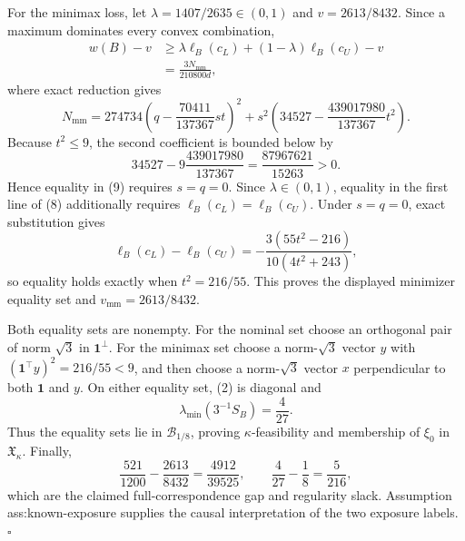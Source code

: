 For the minimax loss, let \(\lambda=1407/2635\in(0,1)\) and \(v=2613/8432\).  Since a maximum dominates every convex combination,
\[
\begin{aligned}
w(B)-v
&\ge \lambda\ell_B(c_L)+(1-\lambda)\ell_B(c_U)-v\\
&=\frac{3N_{\mathrm{mm}}}{210800d},
\end{aligned}
\tag{8}
\]
where exact reduction gives
\[
N_{\mathrm{mm}}
=274734\left(q-\frac{70411}{137367}st\right)^2
+s^2\left(34527-\frac{439017980}{137367}t^2\right).
\tag{9}
\]
Because \(t^2\le9\), the second coefficient is bounded below by
\[
34527-9\frac{439017980}{137367}
=\frac{87967621}{15263}>0.
\tag{10}
\]
Hence equality in (9) requires \(s=q=0\).  Since \(\lambda\in(0,1)\), equality in the first line of (8) additionally requires \(\ell_B(c_L)=\ell_B(c_U)\).  Under \(s=q=0\), exact substitution gives
\[
\ell_B(c_L)-\ell_B(c_U)
=-\frac{3(55t^2-216)}{10(4t^2+243)},
\tag{11}
\]
so equality holds exactly when \(t^2=216/55\).  This proves the displayed minimizer equality set and \(v_{\mathrm{mm}}=2613/8432\).

Both equality sets are nonempty.  For the nominal set choose an orthogonal pair of norm \(\sqrt3\) in \(\mathbf1^\perp\).  For the minimax set choose a norm-\(\sqrt3\) vector \(y\) with \((\mathbf1^{\top}y)^2=216/55<9\), and then choose a norm-\(\sqrt3\) vector \(x\) perpendicular to both \(\mathbf1\) and \(y\).  On either equality set, (2) is diagonal and
\[
\lambda_{\min}(3^{-1}S_B)=\frac4{27}.
\tag{12}
\]
Thus the equality sets lie in \(\mathcal B_{1/8}\), proving \(\kappa\)-feasibility and membership of \(\xi_0\) in \(\mathfrak X_\kappa\).  Finally,
\[
\frac{521}{1200}-\frac{2613}{8432}
=\frac{4912}{39525},
\qquad
\frac4{27}-\frac18=\frac5{216},
\tag{13}
\]
which are the claimed full-correspondence gap and regularity slack.  Assumption ass:known-exposure supplies the causal interpretation of the two exposure labels.  \(\square\)